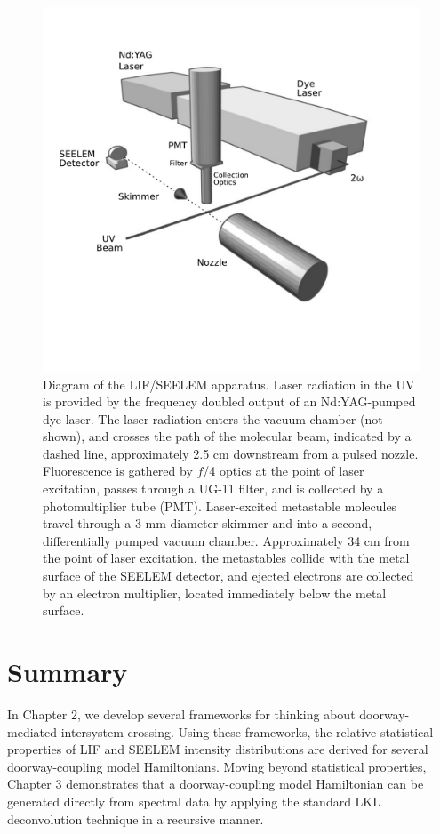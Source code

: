 \documentclass[12pt]{mitthesis}
\begin{document}
\begin{figure}
  \caption{Diagram of the LIF/SEELEM apparatus.  Laser radiation in
    the UV is provided by the frequency doubled output of an
    Nd:YAG-pumped dye laser.  The laser radiation enters the vacuum
    chamber (not shown), and crosses the path of the molecular beam,
    indicated by a dashed line, approximately 2.5 cm downstream from a
    pulsed nozzle.  Fluorescence is gathered by $f$/4 optics at the
    point of laser excitation, passes through a UG-11 filter, and is
    collected by a photomultiplier tube (PMT).  Laser-excited
    metastable molecules travel through a 3 mm diameter skimmer and
    into a second, differentially pumped vacuum chamber.
    Approximately 34 cm from the point of laser excitation, the
    metastables collide with the metal surface of the SEELEM detector,
    and ejected electrons are collected by an electron multiplier,
    located immediately below the metal surface.}
  \label{fig:apparatus}

  \centering
  \includegraphics[width=7in,trim=1cm 0 0 0]{apparatus-bw}
\end{figure}

\section{Summary}

In Chapter 2, we develop several frameworks for thinking about
doorway-mediated intersystem crossing.  Using these frameworks, the
relative statistical properties of LIF and SEELEM intensity
distributions are derived for several doorway-coupling model
Hamiltonians.  Moving beyond statistical properties, Chapter 3
demonstrates that a doorway-coupling model Hamiltonian can be
generated directly from spectral data by applying the standard LKL
deconvolution technique in a recursive manner.
\end{document}
